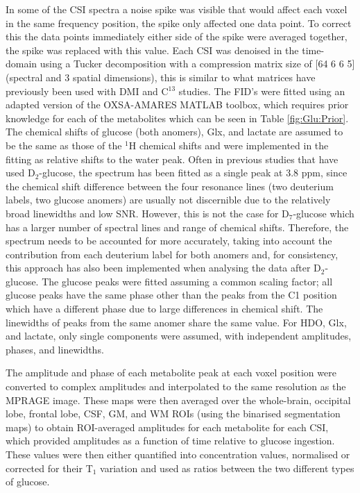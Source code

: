 \documentclass[class=article, crop=false]{standalone}
\begin{document}
In some of the CSI spectra a noise spike was visible that would affect each voxel in the same frequency position, the spike only affected one data point. To correct this the data points immediately either side of the spike were averaged together, the spike was replaced with this value. Each CSI was denoised in the time-domain using a Tucker decomposition\cite{Bader2007EfficientTensors} with a compression matrix size of [64 6 6 5] (spectral and 3 spatial dimensions), this is similar to what  matrices have previously been used with DMI\cite{vonMorze2021ComparisonT, Kreis2020MeasuringMRI} and C$^{13}$ studies\cite{Brender2019DynamicHyperpolarization}. The FID’s were fitted using an adapted version of the OXSA-AMARES MATLAB toolbox\cite{Vanhamme1997ImprovedKnowledge, Purvis2017OXSA:MATLAB}, which requires prior knowledge for each of the metabolites which can be seen in Table \ref{fig:Glu:Prior}. The chemical shifts of glucose (both anomers), Glx, and lactate are assumed to be the same as those of the $^1$H chemical shifts\cite{Govindaraju2000ProtonMetabolites} and were implemented in the fitting as relative shifts to the water peak\cite{Meerwaldt2023InImaging}. Often in previous studies that have used D$_2$-glucose, the spectrum has been fitted as a single peak at 3.8 ppm, since the chemical shift difference between the four resonance lines (two deuterium labels, two glucose anomers) are usually not discernible due to the relatively broad linewidths and low SNR. However, this is not the case for D$_7$-glucose\cite{Govindaraju2000ProtonMetabolites} which has a larger number of spectral lines and range of chemical shifts. Therefore, the spectrum needs to be accounted for more accurately, taking into account the contribution from each deuterium label for both anomers and, for consistency, this approach has also been implemented when analysing the data after D$_2$-glucose. The glucose peaks were fitted assuming a common scaling factor; all glucose peaks have the same phase other than the peaks from the C1 position which have a different phase due to large differences in chemical shift. The linewidths of peaks from the same anomer share the same value. For HDO, Glx, and lactate, only single components were assumed, with independent amplitudes, phases, and linewidths.

The amplitude and phase of each metabolite peak at each voxel position were converted to complex amplitudes and interpolated to the same resolution as the MPRAGE image. These maps were then averaged over the whole-brain, occipital lobe, frontal lobe, CSF, GM, and WM ROIs (using the binarised segmentation maps) to obtain ROI-averaged amplitudes for each metabolite for each CSI, which provided amplitudes as a function of time relative to glucose ingestion. These values were then either quantified into concentration values, normalised or corrected for their T$_1$ variation and used as ratios between the two different types of glucose.
\end{document}

